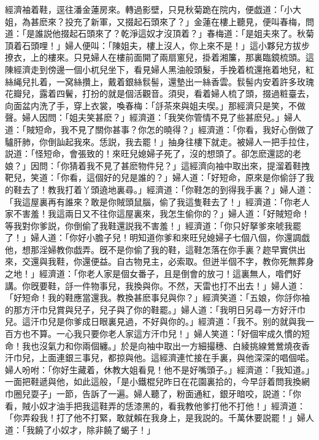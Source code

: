 經濟袖着鞋，逕往潘金蓮房來。轉過影壁，只見秋菊跪在院内，便戯道：「小大姐，為甚麽來？投充了新軍，又掇起石頭來了？」金蓮在樓上聽見，便叫春梅，問道：「是誰説他掇起石頭來了？乾淨這奴才沒頂着？」春梅道：「是姐夫來了。秋菊頂着石頭哩！」婦人便叫：「陳姐夫，樓上沒人，你上來不是！」這小夥兒方拔步撩衣，上的樓來。只見婦人在樓前面開了兩扇窻兒，掛着湘簾，那裏臨鏡梳頭。這陳經濟走到傍邊一個小杌兒坐下，看見婦人黑油般頭髮，手挽着梳還拖着地兒，紅絲䋲兒扎着，一窝絲攢上，戴着銀絲䯼髻，還墊出一絲香雲。䯼髻内安着許多玫瑰花瓣兒，露着四鬢，打扮的就是個活觀音。須臾，看着婦人梳了頭，掇過粧臺去，向面盆内洗了手，穿上衣裳，喚春梅：「㧱茶來與姐夫喫。」那經濟只是笑，不做聲。婦人因問：「姐夫笑甚麽？」經濟道：「我笑你管情不見了些甚麽兒。」婦人道：「賊短命，我不見了關你甚事？你怎的曉得？」經濟道：「你看，我好心倒做了驢肝肺，你倒訕起我來。恁説，我去罷！」抽身往樓下就走。被婦人一把手拉住，説道：「怪短命，會張致的！來旺兒媳婦子死了，沒的想頭了。卻怎麽還認的老娘？」因問：「你猜着我不見了甚麽物件兒？」這經濟向袖中取出來，提溜着鞋拽靶兒，笑道：「你看，這個好的兒是誰的？」婦人道：「好短命，原來是你偷㧱了我的鞋去了！教我打着丫頭遶地裏尋。」經濟道：「你鞋怎的到得我手裏？」婦人道：「我這屋裏再有誰來？敢是你賊頭鼠腦，偷了我這隻鞋去了！」經濟道：「你老人家不害羞！我這兩日又不往你這屋裏來，我怎生偷你的？」婦人道：「好賊短命！等我對你爹説，你倒偷了我鞋還説我不害羞！」經濟道：「你只好拏爹來唬我罷了！」婦人道：「你好小膽子兒！明知道你爹和來旺兒媳婦子七個八個，你還調戯他，想那淫婦教你戯弄。旣不是你偷了我的鞋，這鞋怎落在你手裏？趂早實供出來，交還與我鞋，你還便益。自古物見主，必索取。但迸半個不字，教你死無葬身之地！」經濟道：「你老人家是個女番子，且是倒會的放刁！這裏無人，喒們好講。你旣要鞋，㧱一件物事兒，我換與你。不然，天雷也打不出去！」婦人道：「好短命！我的鞋應當還我。教換甚麽事兒與你？」經濟笑道：「五娘，你㧱你袖的那方汗巾兒賞與兒子，兒子與了你的鞋罷。」婦人道：「我明日另尋一方好汗巾兒。這汗巾兒是你爹成日眼裏見過，不好與你的。」經濟道：「我不。别的就與我一百方也不算。一心我只要你老人家這方汗巾兒！」婦人笑道：「好個牢成久慣的短命！我也沒氣力和你兩個纏。」於是向袖中取出一方細撮穗、白綾挑線鶯鶯燒夜香汗巾兒，上面連銀三事兒，都掠與他。這經濟連忙接在手裏，與他深深的唱個喏。婦人吩咐：「你好生藏着，休教大姐看見！他不是好嘴頭子。」經濟道：「我知道。」一面把鞋遞與他，如此這般，「是小鐵棍兒昨日在花園裏拾的，今早㧱着問我換網巾圈兒耍子」一節，告訴了一遍。婦人聽了，粉面通紅，銀牙暗咬，説道：「你看，賊小奴才油手把我這鞋弄的恁漆黑的，看我教他爹打他不打他！」經濟道：「你弄殺我！打了他不打緊，敢就賴在我身上，是我説的。千萬休要説罷！」婦人道：「我饒了小奴才，除非饒了蝎子！」

